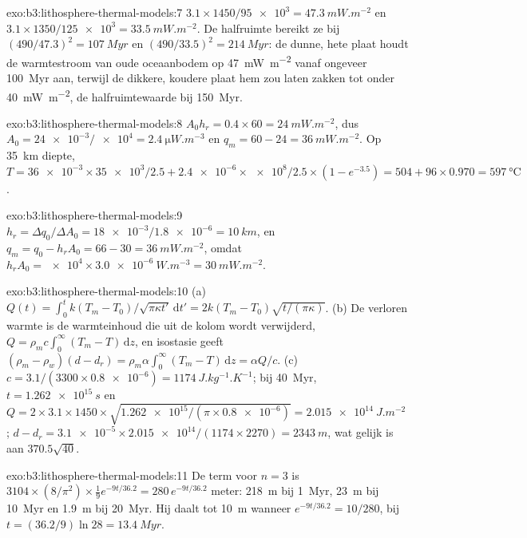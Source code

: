 \begin{solution}{exo:b3:lithosphere-thermal-models:7}
$3.1\times1450/\num{95e3} = \qty{47.3}{mW.m^{-2}}$ en $3.1\times1350/\num{125e3}
= \qty{33.5}{mW.m^{-2}}$. De halfruimte bereikt ze bij $(490/47.3)^2 =
\qty{107}{Myr}$ en $(490/33.5)^2 = \qty{214}{Myr}$: de dunne, hete plaat houdt
de warmtestroom van oude oceaanbodem op \qty{47}{mW.m^{-2}} vanaf ongeveer \qty{100}{Myr}
aan, terwijl de dikkere, koudere plaat hem zou laten zakken tot onder
\qty{40}{mW.m^{-2}}, de halfruimtewaarde bij \qty{150}{Myr}.
\end{solution}

\begin{solution}{exo:b3:lithosphere-thermal-models:8}
$A_0h_r = 0.4\times60 = \qty{24}{mW.m^{-2}}$, dus $A_0 =
\num{24e-3}/\num{e4} = \qty{2.4}{\micro W.m^{-3}}$ en $q_m = 60 - 24 =
\qty{36}{mW.m^{-2}}$. Op \qty{35}{km} diepte, $T = \num{36e-3}\times\num{35e3}/2.5 +
\num{2.4e-6}\times\num{e8}/2.5\times(1 - e^{-3.5}) = 504 + 96\times0.970 =
\qty{597}{\celsius}$.
\end{solution}

\begin{solution}{exo:b3:lithosphere-thermal-models:9}
$h_r = \Delta q_0/\Delta A_0 = \num{18e-3}/\num{1.8e-6} = \qty{10}{km}$, en
$q_m = q_0 - h_rA_0 = 66 - 30 = \qty{36}{mW.m^{-2}}$, omdat $h_rA_0 =
\num{e4}\times\qty{3.0e-6}{W.m^{-3}} = \qty{30}{mW.m^{-2}}$.
\end{solution}

\begin{solution}{exo:b3:lithosphere-thermal-models:10}
(a) $Q(t) = \int_0^tk(T_m - T_0)/\sqrt{\pi\kappa t'}\,\mathrm dt' =
2k(T_m - T_0)\sqrt{t/(\pi\kappa)}$. (b) De verloren warmte is de warmteinhoud
die uit de kolom wordt verwijderd, $Q = \rho_mc\int_0^\infty(T_m - T)\,\mathrm dz$, en
isostasie geeft $(\rho_m - \rho_w)(d - d_r) = \rho_m\alpha\int_0^\infty(T_m -
T)\,\mathrm dz = \alpha Q/c$. (c) $c = 3.1/(3300\times\num{0.8e-6}) =
\qty{1174}{J.kg^{-1}.K^{-1}}$; bij \qty{40}{Myr}, $t = \qty{1.262e15}{s}$ en
$Q = 2\times3.1\times1450\times\sqrt{\num{1.262e15}/(\pi\times\num{0.8e-6})} =
\qty{2.015e14}{J.m^{-2}}$; $d - d_r = \num{3.1e-5}\times\num{2.015e14}/
(1174\times2270) = \qty{2343}{m}$, wat gelijk is aan $370.5\sqrt{40}$.
\end{solution}

\begin{solution}{exo:b3:lithosphere-thermal-models:11}
De term voor $n = 3$ is $3104\times(8/\pi^2)\times\tfrac19e^{-9t/36.2} =
280\,e^{-9t/36.2}$ meter: \qty{218}{m} bij \qty{1}{Myr}, \qty{23}{m} bij
\qty{10}{Myr} en \qty{1.9}{m} bij \qty{20}{Myr}. Hij daalt tot \qty{10}{m} wanneer
$e^{-9t/36.2} = 10/280$, bij $t = (36.2/9)\ln28 = \qty{13.4}{Myr}$.
\end{solution}

